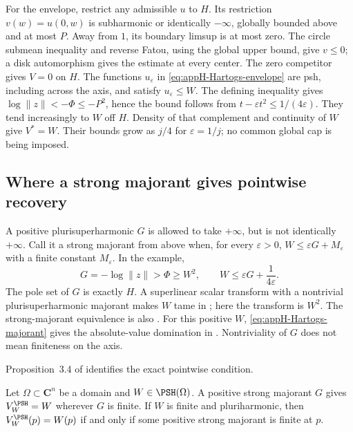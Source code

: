 For the envelope, restrict any admissible $u$ to $H$. Its restriction
$v(w)=u(0,w)$ is subharmonic or identically $-\infty$, globally bounded
above and at most $P$. Away from $1$, its boundary limsup is at most zero.
The circle submean inequality and reverse Fatou, using the global upper
bound, give $v\leq0$; a disk automorphism gives the estimate at every
center. The zero competitor gives $V=0$ on $H$.
The functions $u_\varepsilon$ in \eqref{eq:appH-Hartogs-envelope} are psh,
including across the axis, and satisfy $u_\varepsilon\leq W$.
The defining inequality gives
$\log\|z\|<-\Phi\leq-P^2$, hence the bound follows from
$t-\varepsilon t^2\leq1/(4\varepsilon)$.
They tend increasingly to $W$ off $H$. Density of that complement and
continuity of $W$ give $V^*=W$. Their bounds grow as $j/4$ for
$\varepsilon=1/j$; no common global cap is being imposed.

\subsection{Where a strong majorant gives pointwise recovery}
\label{sec:appH-strong-majorant-recovery}

A positive plurisuperharmonic $G$ is allowed to take $+\infty$, but is
not identically $+\infty$. Call it a strong majorant from above when,
for every $\varepsilon>0$, $W\leq\varepsilon G+M_\varepsilon$ with
a finite constant $M_\varepsilon$. In the example,
\begin{equation*}
 G=-\log\|z\|>\Phi\geq W^2,
 \qquad W\leq\varepsilon G+\frac1{4\varepsilon}.
\tag{H.52}\label{eq:appH-Hartogs-majorant}
\end{equation*}
The pole set of $G$ is exactly $H$. A superlinear scalar transform
with a nontrivial plurisuperharmonic majorant makes $W$ tame in
\cite[Theorem~3.2, actual pp.~4--5]{NilssonWikstrom20QuasiboundedV1};
here the transform is $W^2$.
The strong-majorant equivalence is also
\cite[Lemma~2.1, printed p.~3961]{Nilsson22EnvelopesPublished}.
For this positive $W$, \eqref{eq:appH-Hartogs-majorant} gives the
absolute-value domination in
\cite[Definition~3.1, actual p.~7]{Nilsson25QuasiboundedSolutionsV1}.
Nontriviality of $G$ does not mean finiteness on the axis.

Proposition~3.4 of \cite[actual pp.~7--8]{Wikstrom26BoundedMinorantsV2}
identifies the exact pointwise condition.

\begin{proposition}
\label{prop:appH-strong-majorant-recovery}
Let $\Omega\subset\mathbf C^n$ be a domain and $W\in\PSH(\Omega)$.
A positive strong majorant $G$ gives $V_W^{\PSH}=W$ wherever $G$ is
finite. If $W$ is finite and pluriharmonic, then $V_W^{\PSH}(p)=W(p)$
if and only if some positive strong majorant is finite at $p$.
\end{proposition}


